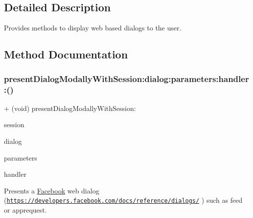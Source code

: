\subsection{Detailed Description}
Provides methods to display web based dialogs to the user. 

\subsection{Method Documentation}
\mbox{\label{interfaceFBWebDialogs_aa4d2e1b0b7a49ea3d08964a09a20ec63}} 
\subsubsection{\texorpdfstring{present\+Dialog\+Modally\+With\+Session\+:dialog\+:parameters\+:handler\+:()}{presentDialogModallyWithSession:dialog:parameters:handler:()}\hspace{0.1cm}{\footnotesize\ttfamily [1/5]}}
{\footnotesize\ttfamily + (void) present\+Dialog\+Modally\+With\+Session\+: \begin{DoxyParamCaption}\item[{(\hyperlink{interfaceFBSession}{F\+B\+Session} $\ast$)}]{session }\item[{dialog:(N\+S\+String $\ast$)}]{dialog }\item[{parameters:(N\+S\+Dictionary $\ast$)}]{parameters }\item[{handler:(F\+B\+Web\+Dialog\+Handler)}]{handler }\end{DoxyParamCaption}}

Presents a \hyperlink{interfaceFacebook}{Facebook} web dialog (\href{https://developers.facebook.com/docs/reference/dialogs/}{\tt https\+://developers.\+facebook.\+com/docs/reference/dialogs/} ) such as feed or apprequest.


